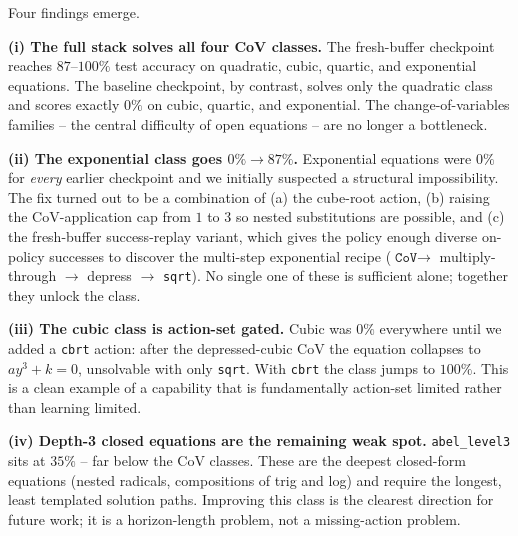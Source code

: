 \documentclass{article}
\theoremstyle{plain}
\theoremstyle{definition}
\theoremstyle{remark}
\begin{document}
Four findings emerge.

\textbf{(i) The full stack solves all four CoV classes.} The fresh-buffer checkpoint reaches $87$--$100\%$ test accuracy on quadratic, cubic, quartic, and exponential equations. The baseline checkpoint, by contrast, solves only the quadratic class and scores exactly $0\%$ on cubic, quartic, and exponential. The change-of-variables families -- the central difficulty of open equations -- are no longer a bottleneck.

\textbf{(ii) The exponential class goes $0\% \to 87\%$.} Exponential equations were $0\%$ for \emph{every} earlier checkpoint and we initially suspected a structural impossibility. The fix turned out to be a combination of (a) the cube-root action, (b) raising the CoV-application cap from $1$ to $3$ so nested substitutions are possible, and (c) the fresh-buffer success-replay variant, which gives the policy enough diverse on-policy successes to discover the multi-step exponential recipe ($\texttt{CoV} \to$ multiply-through $\to$ depress $\to$ \texttt{sqrt}). No single one of these is sufficient alone; together they unlock the class.

\textbf{(iii) The cubic class is action-set gated.} Cubic was $0\%$ everywhere until we added a \texttt{cbrt} action: after the depressed-cubic CoV the equation collapses to $a y^3 + k = 0$, unsolvable with only \texttt{sqrt}. With \texttt{cbrt} the class jumps to $100\%$. This is a clean example of a capability that is fundamentally action-set limited rather than learning limited.

\textbf{(iv) Depth-3 closed equations are the remaining weak spot.} \texttt{abel\_level3} sits at $35\%$ -- far below the CoV classes. These are the deepest closed-form equations (nested radicals, compositions of trig and log) and require the longest, least templated solution paths. Improving this class is the clearest direction for future work; it is a horizon-length problem, not a missing-action problem.

\end{document}
